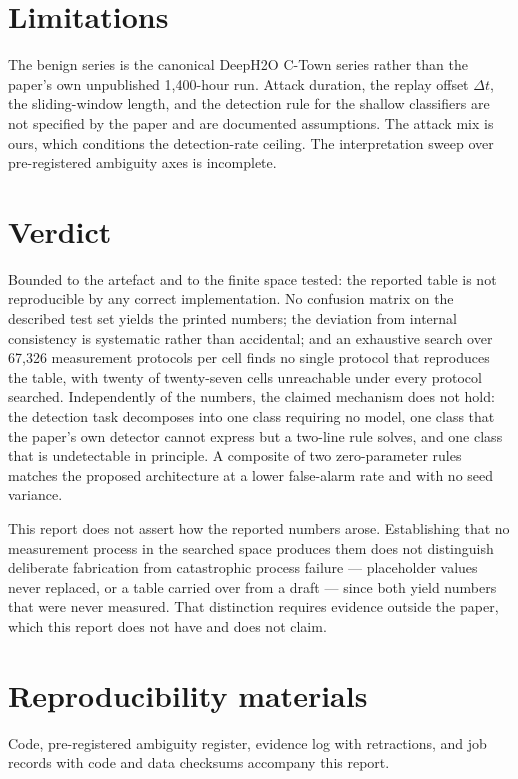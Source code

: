 \documentclass[11pt]{article}
\begin{document}
\section{Limitations}

The benign series is the canonical DeepH2O C-Town series rather than the paper's
own unpublished 1{,}400-hour run. Attack duration, the replay offset
$\Delta t$, the sliding-window length, and the detection rule for the shallow
classifiers are not specified by the paper and are documented assumptions. The
attack mix is ours, which conditions the detection-rate ceiling. The
interpretation sweep over pre-registered ambiguity axes is incomplete.

\section{Verdict}

Bounded to the artefact and to the finite space tested: the reported table is
not reproducible by any correct implementation. No confusion matrix on the
described test set yields the printed numbers; the deviation from internal
consistency is systematic rather than accidental; and an exhaustive search over
67{,}326 measurement protocols per cell finds no single protocol that reproduces
the table, with twenty of twenty-seven cells unreachable under every protocol
searched. Independently of the
numbers, the claimed mechanism does not hold: the detection task decomposes into
one class requiring no model, one class that the paper's own detector cannot
express but a two-line rule solves, and one class that is undetectable in
principle. A composite of two zero-parameter rules matches the proposed
architecture at a lower false-alarm rate and with no seed variance.

This report does not assert how the reported numbers arose. Establishing that no
measurement process in the searched space produces them does not distinguish
deliberate fabrication from catastrophic process failure --- placeholder values
never replaced, or a table carried over from a draft --- since both yield numbers
that were never measured. That distinction requires evidence outside the paper,
which this report does not have and does not claim.

\section{Reproducibility materials}

Code, pre-registered ambiguity register, evidence log with retractions, and job
records with code and data checksums accompany this report.
\end{document}
